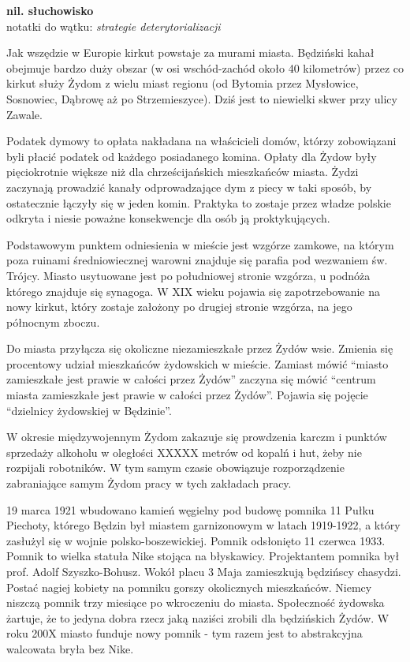 \documentclass[11pt,a4paper,oneside]{article}
\begin{document}
\textbf{nil. słuchowisko}\\
notatki do wątku: \emph{strategie deterytorializacji}

Jak wszędzie w Europie kirkut powstaje za murami miasta. Będziński kahał obejmuje bardzo duży obszar (w osi wschód-zachód około 40 kilometrów) przez co kirkut służy Żydom z wielu miast regionu (od Bytomia przez Mysłowice, Sosnowiec, Dąbrowę aż po Strzemieszyce). Dziś jest to niewielki skwer przy ulicy Zawale.

Podatek dymowy to opłata nakładana na właścicieli domów, którzy zobowiązani byli płacić podatek od każdego posiadanego komina. Opłaty dla Żydow były pięciokrotnie większe niż dla chrześcijańskich mieszkańców miasta. Żydzi zaczynają prowadzić kanały odprowadzające dym z piecy w taki sposób, by ostatecznie łączyły się w jeden komin. Praktyka to zostaje przez władze polskie odkryta i niesie poważne konsekwencje dla osób ją proktykujących.

Podstawowym punktem odniesienia w mieście jest wzgórze zamkowe, na którym poza ruinami średniowiecznej warowni znajduje się parafia pod wezwaniem św. Trójcy. Miasto usytuowane jest po południowej stronie wzgórza, u podnóża którego znajduje się synagoga. W XIX wieku pojawia się zapotrzebowanie na nowy kirkut, który zostaje założony po drugiej stronie wzgórza, na jego północnym zboczu.

Do miasta przyłącza się okoliczne niezamieszkałe przez Żydów wsie. Zmienia się procentowy udział mieszkańców żydowskich w mieście. Zamiast mówić “miasto zamieszkałe jest prawie w całości przez Żydów” zaczyna się mówić “centrum miasta zamieszkałe jest prawie w całości przez Żydów”. Pojawia się pojęcie “dzielnicy żydowskiej w Będzinie”.

W okresie międzywojennym Żydom zakazuje się prowdzenia karczm i punktów sprzedaży alkoholu w oległości XXXXX metrów od kopalń i hut, żeby nie rozpijali robotników. W tym samym czasie obowiązuje rozporządzenie zabraniające samym Żydom pracy w tych zakładach pracy.

19 marca 1921 wbudowano kamień węgielny pod budowę pomnika 11 Pułku Piechoty, którego Będzin był miastem garnizonowym w latach 1919-1922, a który zasłużyl się w wojnie polsko-boszewickiej. Pomnik odsłonięto 11 czerwca 1933. Pomnik to wielka statuła Nike stojąca na błyskawicy. Projektantem pomnika był prof. Adolf Szyszko-Bohusz. Wokół placu 3 Maja zamieszkują będzińscy chasydzi. Postać nagiej kobiety na pomniku gorszy okolicznych mieszkańców. Niemcy niszczą pomnik trzy miesiące po wkroczeniu do miasta. Społeczność żydowska żartuje, że to jedyna dobra rzecz jaką naziści zrobili dla będzińskich Żydów. W roku 200X miasto funduje nowy pomnik - tym razem jest to abstrakcyjna walcowata bryła bez Nike.
\end{document}
